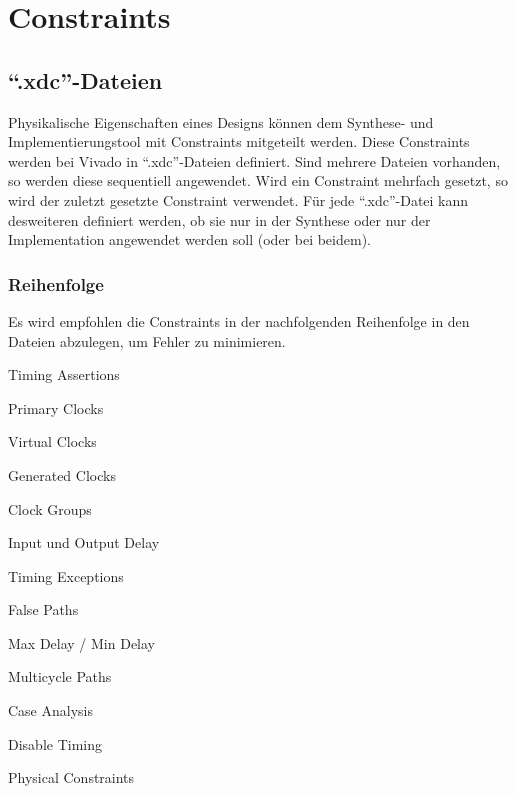 \section{Constraints}
\subsection{``.xdc''-Dateien}
Physikalische Eigenschaften eines Designs können dem Synthese- und Implementierungstool mit Constraints mitgeteilt werden. Diese Constraints werden bei Vivado in ``.xdc''-Dateien definiert. Sind mehrere Dateien vorhanden, so werden diese sequentiell angewendet. Wird ein Constraint mehrfach gesetzt, so wird der zuletzt gesetzte Constraint verwendet. Für jede ``.xdc''-Datei kann desweiteren definiert werden, ob sie nur in der Synthese oder nur der Implementation angewendet werden soll (oder bei beidem).


\subsubsection{Reihenfolge}
Es wird empfohlen die Constraints in der nachfolgenden Reihenfolge in den Dateien abzulegen, um Fehler zu minimieren.
\begin{multicols}{3}
    \begin{compactenum}
        \item Timing Assertions
        \begin{compactenum}
            \item Primary Clocks
            \item Virtual Clocks
            \item Generated Clocks
            \item Clock Groups
            \item Input und Output Delay
        \end{compactenum}
        \item Timing Exceptions
        \begin{compactenum}
            \item False Paths
            \item Max Delay / Min Delay
            \item Multicycle Paths
            \item Case Analysis
            \item Disable Timing
        \end{compactenum}
        \item Physical Constraints \\ \ \\ \ \\ \ \\
    \end{compactenum}
\end{multicols}

